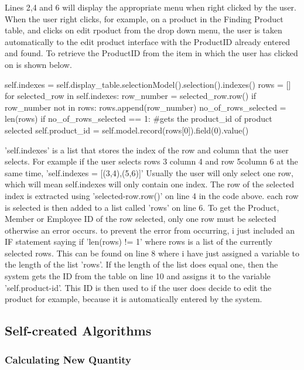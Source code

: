 Lines 2,4 and 6 will display the appropriate menu when right clicked by the user. When the user right clicks, for example, on a product in the Finding Product table, and clicks on edit rpoduct from the drop down menu, the user is taken automatically to the edit product interface with the ProductID already entered and found. To retrieve the ProductID from the item in which the user has clicked on is shown below.

\begin{python}
self.indexes = self.display_table.selectionModel().selection().indexes()
rows = []
for selected_row in self.indexes:
	row_number = selected_row.row()
	if row_number not in rows:
		rows.append(row_number)      
no_of_rows_selected = len(rows)
if no_of_rows_selected == 1:
            #gets the product_id of product selected
            self.product_id = self.model.record(rows[0]).field(0).value()
\end{python}

'self.indexes' is a list that stores the index of the row and column that the user selects. For example if the user selects rows 3 column 4 and row 5column 6 at the same time, 'self.indexes = [(3,4),(5,6)]' Usually the user will only select one row, which will mean self.indexes will only contain one index. The row of the selected index is extracted using 'selected-row.row()' on line 4 in the code above. each row is selected is then added to a list called 'rows' on line 6. To get the Product, Member or Employee ID of the row selected, only one row must be selected otherwise an error occurs. to prevent the error from occurring, i just included an IF statement saying if 'len(rows) != 1' where rows is a list of the currently selected rows. This can be found on line 8 where i have just assigned a variable to the length of the list 'rows'. If the length of the list does equal one, then the system gets the ID from the table on line 10 and assigns it to the variable 'self.product-id'. This ID is then used to if the user does decide to edit the product for example, because it is automatically entered by the system.


\pagebreak

\subsection{Self-created Algorithms}

\subsubsection{Calculating New Quantity}

